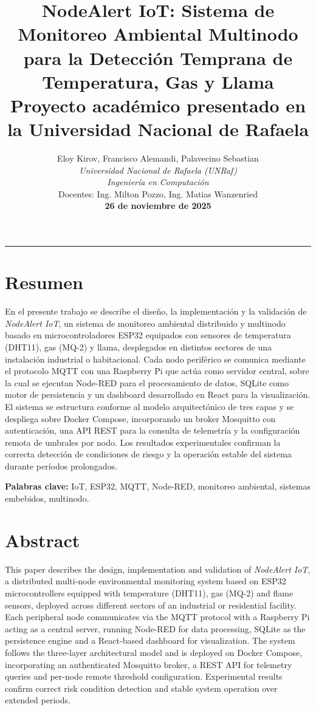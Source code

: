 \documentclass[11pt,a4paper]{article}
\title{\textbf{\LARGE NodeAlert IoT: Sistema de Monitoreo Ambiental Multinodo para la Detecci\'on Temprana de Temperatura, Gas y Llama}\\[1cm]
\large Proyecto acad\'emico presentado en la Universidad Nacional de Rafaela\\[3cm]}
\author{
\Large Eloy Kirov, Francisco Alemandi, Palavecino Sebastian\\[0.5cm]
\textit{Universidad Nacional de Rafaela (UNRaf)}\\
\textit{Ingenier\'ia en Computaci\'on}\\[0.5cm]
Docentes: Ing. Milton Pozzo, Ing. Matias Wanzenried\\[1cm]
\textbf{26 de noviembre de 2025}
}
\date{}
\begin{document}
\maketitle
\thispagestyle{empty}
\newpage

\vspace{-0.5cm}
\begin{center}
\rule{8cm}{0.4pt}
\end{center}
\vspace{0.3cm}

\section{Resumen}
En el presente trabajo se describe el dise\~no, la implementaci\'on y la validaci\'on de \textit{NodeAlert IoT}, un sistema de monitoreo ambiental distribuido y multinodo basado en microcontroladores ESP32 equipados con sensores de temperatura (DHT11), gas (MQ-2) y llama, desplegados en distintos sectores de una instalaci\'on industrial o habitacional. Cada nodo perif\'erico se comunica mediante el protocolo MQTT con una Raspberry Pi que act\'ua como servidor central, sobre la cual se ejecutan Node-RED para el procesamiento de datos, SQLite como motor de persistencia y un dashboard desarrollado en React para la visualizaci\'on. El sistema se estructura conforme al modelo arquitect\'onico de tres capas \citep{rivera2024} y se despliega sobre Docker Compose, incorporando un broker Mosquitto con autenticaci\'on, una API REST para la consulta de telemetr\'ia y la configuraci\'on remota de umbrales por nodo. Los resultados experimentales confirman la correcta detecci\'on de condiciones de riesgo y la operaci\'on estable del sistema durante per\'iodos prolongados.

\textbf{Palabras clave:} IoT, ESP32, MQTT, Node-RED, monitoreo ambiental, sistemas embebidos, multinodo.

\vspace{0.5cm}
\section{Abstract}
This paper describes the design, implementation and validation of \textit{NodeAlert IoT}, a distributed multi-node environmental monitoring system based on ESP32 microcontrollers equipped with temperature (DHT11), gas (MQ-2) and flame sensors, deployed across different sectors of an industrial or residential facility. Each peripheral node communicates via the MQTT protocol with a Raspberry Pi acting as a central server, running Node-RED for data processing, SQLite as the persistence engine and a React-based dashboard for visualization. The system follows the three-layer architectural model \citep{rivera2024} and is deployed on Docker Compose, incorporating an authenticated Mosquitto broker, a REST API for telemetry queries and per-node remote threshold configuration. Experimental results confirm correct risk condition detection and stable system operation over extended periods.
\end{document}
